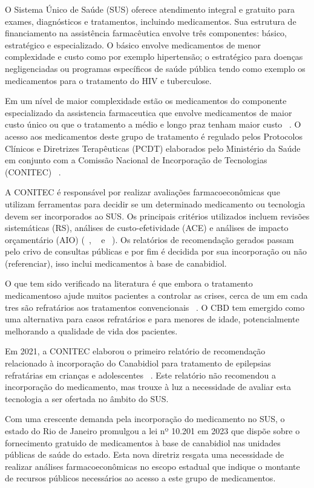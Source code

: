 \documentclass[article,a4paper,12pt,brazil,sumario=tradicional]{abntex2}
\begin{document}
O Sistema Único de Saúde (SUS) oferece atendimento integral e gratuito para exames, diagnósticos e tratamentos, incluindo medicamentos. Sua estrutura de financiamento na assistência farmacêutica envolve três componentes: básico, estratégico e especializado. O básico envolve medicamentos de menor complexidade e custo como por exemplo hipertensão; o estratégico para doenças negligenciadas ou programas específicos de saúde pública tendo como exemplo os medicamentos para o tratamento do HIV e tuberculose.

Em um nível de maior complexidade estão os medicamentos do componente especializado da assistencia farmaceutica que envolve medicamentos de maior custo único ou que o tratamento a médio e longo praz tenham maior custo ~\cite{portaria1554}. O acesso aos medicamentos deste grupo de tratamento é regulado pelos Protocolos Clínicos e Diretrizes Terapêuticas (PCDT) elaborados pelo Ministério da Saúde em conjunto com a Comissão Nacional de Incorporação de Tecnologias (CONITEC) ~\cite{lei12401}. 

A CONITEC é responsável por realizar avaliações farmacoeconômicas que utilizam ferramentas para decidir se um determinado medicamento ou tecnologia devem ser incorporados ao SUS. Os principais critérios utilizados incluem revisões sistemáticas (RS), análises de custo-efetividade (ACE) e análises de impacto orçamentário (AIO) (~\cite{revisoesRS}, ~\cite{analiseCE} e ~\cite{diretrizesAIO}). Os relatórios de recomendação gerados passam pelo crivo de consultas públicas e por fim é decidida por sua incorporação ou não (referenciar), isso inclui medicamentos à base de canabidiol.

O que tem sido verificado na literatura é que embora o tratamento medicamentoso ajude muitos pacientes a controlar as crises, cerca de um em cada tres são refratários aos tratamentos convencionais ~\cite{relatorioSociedadeConitec}. O CBD tem emergido como uma alternativa para casos refratários e para menores de idade, potencialmente melhorando a qualidade de vida dos pacientes.

Em 2021, a CONITEC elaborou o primeiro relatório de recomendação relacionado à incorporação do Canabidiol para tratamento de epilepsias refratárias em crianças e adolescentes ~\cite{recomencacaoConitec}. Este relatório não recomendou a incorporação do medicamento, mas trouxe à luz a necessidade de avaliar esta tecnologia a ser ofertada no âmbito do SUS.

Com uma crescente demanda pela incorporação do medicamento no SUS, o estado do Rio de Janeiro promulgou a lei nº 10.201 em 2023 que dispõe sobre o fornecimento gratuido de medicamentos à base de canabidiol nas unidades públicas de saúde do estado. Esta nova diretriz resgata uma necessidade de realizar análises farmacoeconômicas no escopo estadual que indique o montante de recursos públicos necessários ao acesso a este grupo de medicamentos.
\end{document}
